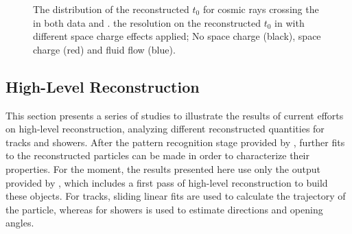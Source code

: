 \begin{figure}[!ht]
\centering
{}
\caption[Distribution of reconstructed $t_{0}$ for cosmic rays]{\protect{} The distribution of the reconstructed $t_{0}$ for cosmic rays crossing the  in both data and .  \protect{} the resolution on the reconstructed $t_{0}$ in  with different space charge effects applied; No space charge (black), space charge (red) and fluid flow (blue).}
\label{fig:pandora_protodune_cr_t0}
\end{figure}


\subsection{High-Level Reconstruction}
\label{sec:Pandora:High}

This section presents a series of studies to illustrate the results of current efforts on high-level reconstruction, analyzing different reconstructed quantities for tracks and showers. After the pattern recognition stage provided by , further fits to the reconstructed \threed particles can be made in order to characterize their properties. For the moment, the results presented here use only the output provided by , which includes a first pass of high-level reconstruction to build these objects. For tracks,  sliding linear fits are used to calculate the trajectory of the particle, whereas for showers  is used to estimate directions and opening angles. 

